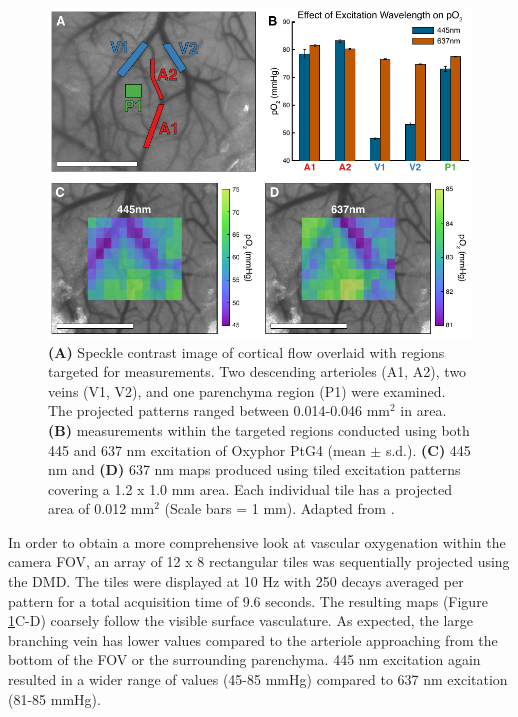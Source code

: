 \begin{figure}
    \includegraphics{figures/chapter_2/staticpO2.pdf}
    \caption[\textbf{(A)} Speckle contrast image of cortical flow overlaid with regions targeted for  measurements. Two descending arterioles (A1, A2), two veins (V1, V2), and one parenchyma region (P1) were examined. The projected patterns ranged between 0.014-0.046 mm$^2$ in area. \textbf{(B)}  measurements within the targeted regions conducted using both 445 and 637 nm excitation of Oxyphor PtG4 (mean $\pm$ s.d.). \textbf{(C)} 445 nm and \textbf{(D)} 637 nm  maps produced using tiled excitation patterns covering a 1.2 x 1.0 mm area. Each individual tile has a projected area of 0.012 mm$^2$ (Scale bars = 1 mm).]{
        \label{fig:staticpO2}
        \textbf{(A)} Speckle contrast image of cortical flow overlaid with regions targeted for  measurements. Two descending arterioles (A1, A2), two veins (V1, V2), and one parenchyma region (P1) were examined. The projected patterns ranged between 0.014-0.046 mm$^2$ in area. \textbf{(B)}  measurements within the targeted regions conducted using both 445 and 637 nm excitation of Oxyphor PtG4 (mean $\pm$ s.d.). \textbf{(C)} 445 nm and \textbf{(D)} 637 nm  maps produced using tiled excitation patterns covering a 1.2 x 1.0 mm area. Each individual tile has a projected area of 0.012 mm$^2$ (Scale bars = 1 mm). Adapted from \cite{Sullender:2018ff}.
    }
\end{figure}

In order to obtain a more comprehensive look at vascular oxygenation within the camera FOV, an array of 12 x 8 rectangular tiles was sequentially projected using the DMD. The tiles were displayed at 10 Hz with 250 decays averaged per pattern for a total acquisition time of 9.6 seconds. The resulting  maps (Figure \ref{fig:staticpO2}C-D) coarsely follow the visible surface vasculature. As expected, the large branching vein has lower  values compared to the arteriole approaching from the bottom of the FOV or the surrounding parenchyma. 445 nm excitation again resulted in a wider range of  values (45-85 mmHg) compared to 637 nm excitation (81-85 mmHg).

